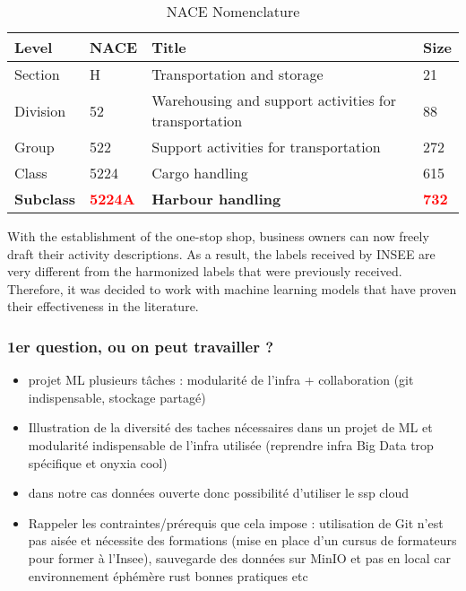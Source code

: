 \begin{table}[htbp]
    \centering
    \begin{tabular}{llll}
    \textbf{Level} & \textbf{NACE} & \textbf{Title} & \textbf{Size} \\ \hline
    Section & H & Transportation and storage & 21 \\ \hline
    Division & 52 & Warehousing and support activities for transportation & 88 \\ \hline
    Group & 522 & Support activities for transportation & 272 \\ \hline
    Class & 5224 & Cargo handling & 615 \\ \hline
    \textbf{Subclass} & \textbf{\textcolor{red}{5224A}} & \textbf{Harbour handling} & \textbf{\textcolor{red}{732}} \\ 
    \end{tabular}
    \caption{NACE Nomenclature}
    \label{tab:nace-nomenclature}
    \end{table}


With the establishment of the one-stop shop, business owners can now freely draft their activity descriptions. As a result, the labels received by INSEE are very different from the harmonized labels that were previously received. Therefore, it was decided to work with machine learning models that have proven their effectiveness in the literature.



\subsubsection{1er question, ou on peut travailler ?}
\begin{itemize}

    \item projet ML plusieurs tâches : modularité de l'infra + collaboration (git indispensable, stockage partagé)
    \item Illustration de la diversité des taches nécessaires dans un projet de ML et modularité indispensable de l'infra utilisée (reprendre infra Big Data trop spécifique et onyxia cool)
    \item dans notre cas données ouverte donc possibilité d'utiliser le ssp cloud
    \item Rappeler les contraintes/prérequis que cela impose : utilisation de Git n'est pas aisée et nécessite des formations (mise en place d'un cursus de formateurs pour former à l'Insee), sauvegarde des données sur MinIO et pas en  local car environnement éphémère
    rust bonnes pratiques etc
\end{itemize}

